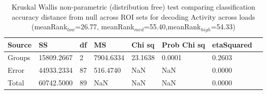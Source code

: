 \begin{table}
\centering
\begin{tabular}[0.2em]{@{}llllllll@{}}\toprule
Source & SS & df & MS & Chi sq & Prob Chi sq & etaSquared\\\toprule[0.2em]
Groups & 15809.2667 & 2 & 7904.6334 & 23.1638 & 0.0001 & 0.2603 \\\midrule
Error & 44933.2334 & 87 & 516.4740 & NaN & NaN & 0.0000 \\\midrule
Total & 60742.5000 & 89 & NaN & NaN & NaN & 0.0000 \\\bottomrule[0.2em]
\end{tabular}
\caption{Kruskal Wallis non-parametric (distribution free) test comparing classification accuracy distance from null across ROI sets for decoding Activity across loads (meanRank$_{low}$=26.77, meanRank$_{med}$=55.40,meanRank$_{high}$=54.33)\label{tabel:null}}
\end{table}
